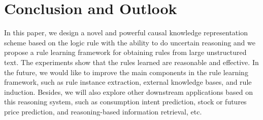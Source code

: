 


\section{Conclusion and Outlook}
\label{sec:conclusion}

In this paper, we design a novel and powerful causal knowledge representation scheme based on the logic rule with the ability to do uncertain reasoning and we propose a rule learning framework for obtaining rules from large unstructured text. The experiments show that the rules learned are reasonable and effective.
In the future, we would like to improve the main components in the rule learning framework, such as rule instance extraction, external knowledge bases, and rule induction. Besides, we will also explore other downstream applications based on this reasoning system, such as consumption intent prediction, stock or futures price prediction, and reasoning-based information retrieval, etc.





